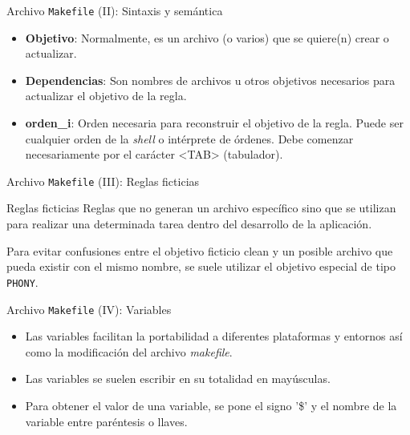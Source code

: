 \documentclass{beamer}
\begin{document}
	\begin{frame}{Archivo \texttt{Makefile} (II): Sintaxis y semántica}
		
		\begin{itemize}		
			\vfill\item \justifying \textbf{Objetivo}: Normalmente, es un archivo (o varios) que se quiere(n) crear o actualizar.
			\vfill\item \justifying \textbf{Dependencias}: Son nombres de archivos u otros objetivos necesarios para actualizar el objetivo de la regla.
			\vfill\item \justifying \textbf{orden\_{i}}: Orden necesaria para reconstruir el objetivo de la regla. Puede ser cualquier orden de la \textit{shell} o intérprete de órdenes. Debe comenzar necesariamente por el carácter <TAB> (tabulador).
		\end{itemize}
	\end{frame}	
	
	\begin{frame}{Archivo \texttt{Makefile} (III): Reglas ficticias}
		\begin{block}{Reglas ficticias}		
			\justifying Reglas que no generan un archivo específico sino que se utilizan para realizar una determinada tarea dentro del desarrollo de la aplicación. 
		\end{block}		
\vfill Para evitar confusiones entre el objetivo ficticio clean y un posible archivo que pueda existir con el mismo nombre, se suele utilizar el objetivo especial de tipo \texttt{PHONY}.
		
	\end{frame}	

	\begin{frame}{Archivo \texttt{Makefile} (IV): Variables}
		\begin{itemize}		
			\vfill\item \justifying Las variables facilitan la portabilidad a diferentes plataformas y entornos así como la modificación del archivo \textit{makefile}.
			\vfill\item \justifying Las variables se suelen escribir en su totalidad en mayúsculas. 
			\vfill\item \justifying Para obtener el valor de una variable, se pone el signo '\$' y el nombre de la
variable entre paréntesis o llaves.
		\end{itemize}	
		
	\end{frame}	
	
\end{document}
